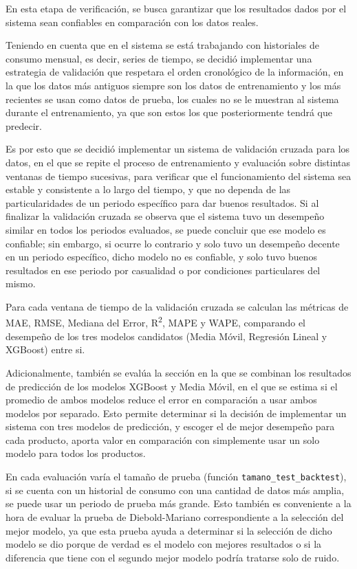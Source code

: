 En esta etapa de verificación, se busca garantizar que los resultados dados por
el sistema sean confiables en comparación con los datos reales.

Teniendo en cuenta que en el sistema se está trabajando con historiales de consumo mensual, es decir, series de tiempo, se decidió implementar una estrategia de validación que respetara el orden cronológico de la información, en la que los datos más antiguos siempre son los datos de entrenamiento y los más recientes se usan como datos de prueba, los cuales no se le muestran al sistema durante el entrenamiento, ya que son estos los que posteriormente tendrá que predecir.

Es por esto que se decidió implementar un sistema de validación cruzada para los
datos, en el que se repite el proceso de entrenamiento y evaluación sobre
distintas ventanas de tiempo sucesivas, para verificar que el funcionamiento del
sistema sea estable y consistente a lo largo del tiempo, y que no dependa de las
particularidades de un periodo específico para dar buenos resultados. Si al
finalizar la validación cruzada se observa que el sistema tuvo un desempeño
similar en todos los periodos evaluados, se puede concluir que ese modelo es
confiable; sin embargo, si ocurre lo contrario y solo tuvo un desempeño decente
en un periodo específico, dicho modelo no es confiable, y solo tuvo buenos
resultados en ese periodo por casualidad o por condiciones particulares del
mismo.

Para cada ventana de tiempo de la validación cruzada se calculan las métricas de MAE, RMSE, Mediana del Error, R\textsuperscript{2}, MAPE y WAPE, comparando el desempeño de los tres modelos candidatos (Media Móvil, Regresión Lineal y XGBoost) entre si.

Adicionalmente, también se evalúa la sección en la que se combinan los resultados de predicción de los modelos XGBoost y Media Móvil, en el que se estima si el promedio de ambos modelos reduce el error en comparación a usar ambos modelos por separado. Esto permite determinar si la decisión de implementar un sistema con tres modelos de predicción, y escoger el de mejor desempeño para cada producto, aporta valor en comparación con simplemente usar un solo modelo para todos los productos.
    

En cada evaluación varía el tamaño de prueba (función \texttt{tamano\_test\_backtest}), si se cuenta con un historial de consumo con una cantidad de datos más amplia, se puede usar un periodo de prueba más grande. Esto también es conveniente a la hora de evaluar la prueba de  Diebold-Mariano correspondiente a la selección del mejor modelo, ya que esta prueba ayuda a determinar si la selección de dicho modelo se dio porque de verdad es el modelo con mejores resultados o si la diferencia que tiene con el segundo mejor modelo podría tratarse solo de ruido.

